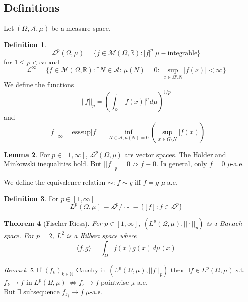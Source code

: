 \documentclass[a4paper, 12pt]{article}
\theoremstyle{plain}
\newtheorem{theorem}{Theorem}[subsection] %
\theoremstyle{definition}
\newtheorem{definition}[theorem]{Definition} %
\theoremstyle{lemma}
\newtheorem{lemma}[theorem]{Lemma}
\theoremstyle{remark}
\newtheorem{remark}[theorem]{Remark}
\theoremstyle{corollary}
\theoremstyle{example}
\begin{document}
	\subsection{Definitions}
	Let $(\Omega, \mathcal{A}, \mu)$ be a measure space.
	\begin{definition}
		$$\mathcal{L}^p(\Omega, \mu) = \{f \in \mathcal{M}(\Omega, \mathbb{R}): |f|^p \; \mu-\text{integrable}\}$$ for $1\leq p < \infty$ and \[\mathcal{L}^\infty = \{f \in \mathcal{M}(\Omega, \mathbb{R}): \exists N \in \mathcal{A}: \, \mu(N) = 0: \, \sup_{x \in \Omega\setminus N} |f(x)| < \infty\}\]
		We define the functions \[||f||_p = \left(\int_{\Omega}|f(x)|^p \, d\mu\right)^{1/p}\] and \[||f||_\infty = \text{esssup} |f| = \inf_{N \in \mathcal{A}, \mu(N) = 0} \left(\sup_{x \in \Omega\setminus N}|f(x)\right)\]
	\end{definition}
	\begin{lemma}
		For $p \in [1,\infty]$, $\mathcal{L}^p(\Omega, \mu)$ are vector spaces. The Hölder and Minkowski inequalities hold. But $||f||_p = 0 \not \Rightarrow f \equiv 0$. In general, only $f = 0$ $\mu$-a.e.
	\end{lemma}
	We define the equivalence relation $\sim$: $f\sim g$ iff $f = g$ $\mu$-a.e.
	\begin{definition}
		For $p \in [1,\infty]$ \[L^p(\Omega, \mu) = \mathcal{L}^p/\sim = \{[f]: f \in \mathcal{L}^p\}\]
	\end{definition}
	\begin{theorem}[Fischer-Riesz]
		For $p \in [1,\infty]$, $(L^p(\Omega, \mu), ||\cdot ||_p)$ is a Banach space. For $p = 2$, $L^2$ is a Hilbert space where \[\langle f,g\rangle = \int_{\Omega} f(x)g(x) \, d\mu(x)\]
	\end{theorem}
	\begin{remark}
		If $(f_k)_{k \in \mathbb{N}}$ Cauchy in $(L^p(\Omega, \mu), ||f||_p)$ then $\exists f \in L^p(\Omega, \mu)$ s.t. $f_k \to f$ in $L^p(\Omega, \mu)$ $\not \Rightarrow f_k \to f$ pointwise $\mu$-a.e.\\
		But $\exists$ subsequence $f_{k_j} \to f$ $\mu$-a.e.
	\end{remark}
\end{document}
